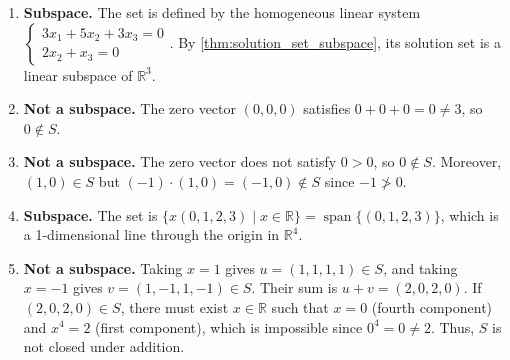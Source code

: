 \begin{exercisesolution*}
\label{sol:subspace_identification_mc}
\begin{enumerate}[label=\textbf{(\arabic*)}]
    \item \textbf{Subspace.} The set is defined by the homogeneous linear system $\begin{cases} 3x_1 + 5x_2 + 3x_3 = 0 \\ 2x_2 + x_3 = 0 \end{cases}$. By \cref{thm:solution_set_subspace}, its solution set is a linear subspace of $\mathbb{R}^3$.
    \item \textbf{Not a subspace.} The zero vector $(0,0,0)$ satisfies $0 + 0 + 0 = 0 \ne 3$, so $0 \notin S$.
    \item \textbf{Not a subspace.} The zero vector does not satisfy $0 > 0$, so $0 \notin S$. Moreover, $(1, 0) \in S$ but $(-1) \cdot (1, 0) = (-1, 0) \notin S$ since $-1 \ngtr 0$.
    \item \textbf{Subspace.} The set is $\{x(0, 1, 2, 3) \mid x \in \mathbb{R}\} = \operatorname{span}\{(0, 1, 2, 3)\}$, which is a 1-dimensional line through the origin in $\mathbb{R}^4$.
    \item \textbf{Not a subspace.} Taking $x = 1$ gives $u = (1, 1, 1, 1) \in S$, and taking $x = -1$ gives $v = (1, -1, 1, -1) \in S$. Their sum is $u + v = (2, 0, 2, 0)$. If $(2, 0, 2, 0) \in S$, there must exist $x \in \mathbb{R}$ such that $x = 0$ (fourth component) and $x^4 = 2$ (first component), which is impossible since $0^4 = 0 \ne 2$. Thus, $S$ is not closed under addition.
\end{enumerate}
\end{exercisesolution*}

